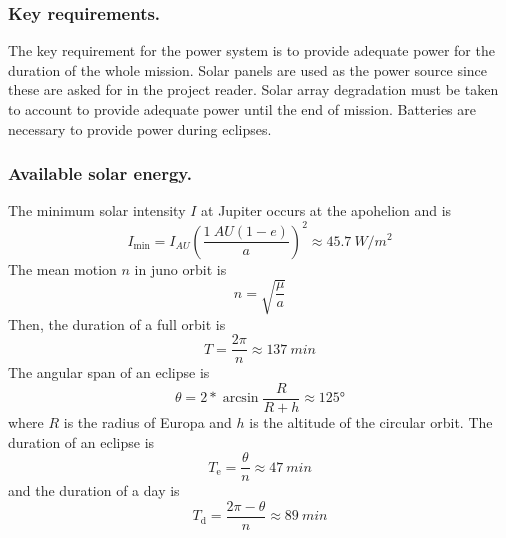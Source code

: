 

\subsubsection{Key requirements.}

The key requirement for the power system is to provide adequate power
for the duration of the whole mission. Solar panels are used as the
power source since these are asked for in the project reader. Solar
array degradation must be taken to account to provide adequate power
until the end of mission. Batteries are necessary to provide power
during eclipses.


\subsubsection{Available solar energy.}

The minimum solar intensity $I$ at Jupiter occurs at the apohelion and is
\begin{equation}
  I_{\mathrm{min}} = I_{\si{AU}} (\frac{\SI{1}{AU} (1 - e)}{a})^2
  \approx \SI{45.7}{W/m^2}
\end{equation}
The mean motion $n$ in juno orbit is
\begin{equation}
  n = \sqrt{\frac{\mu}{a}}
\end{equation}
Then, the duration of a full orbit is
\begin{equation}
  T = \frac{2 \pi}{n} \approx \SI{137}{min}
\end{equation}
The angular span of an eclipse is
\begin{equation}
  \theta = 2 * \arcsin \frac{R}{R + h} \approx \ang{125}
\end{equation}
where $R$ is the radius of Europa and $h$ is the altitude of the
circular orbit. The duration of an eclipse is
\begin{equation}
  T_{\mathrm{e}} = \frac{\theta}{n} \approx \SI{47}{min}
\end{equation}
and the duration of a day is
\begin{equation}
  T_{\mathrm{d}} = \frac{2 \pi - \theta}{n} \approx \SI{89}{min}
\end{equation}

